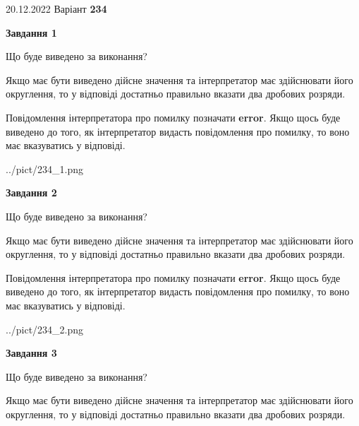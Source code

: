 \documentclass[12pt, ukrainian]{article}
\begin{document}
{20.12.2022 Варіант \No \textbf { 234 }\par}
{
\begin {Large}

{\begin {center}\textbf{Завдання 1}\end {center}}\par
Що буде виведено за виконання? \par

Якщо має бути виведено дійсне значення та інтерпретатор має здійснювати його округлення, 
то у відповіді достатньо правильно вказати два дробових розряди.

Повідомлення інтерпретатора про помилку позначати \textbf{error}.
Якщо щось буде виведено до того, як інтерпретатор видасть повідомлення про помилку, 
то воно має вказуватись у відповіді. \par

\begin{center}
	{../pict/234_1.png}
\end{center}
\newpage

{\begin {center}\textbf{Завдання 2}\end {center}}\par
Що буде виведено за виконання? \par

Якщо має бути виведено дійсне значення та інтерпретатор має здійснювати його округлення, 
то у відповіді достатньо правильно вказати два дробових розряди.

Повідомлення інтерпретатора про помилку позначати \textbf{error}.
Якщо щось буде виведено до того, як інтерпретатор видасть повідомлення про помилку, 
то воно має вказуватись у відповіді. \par

\begin{center}
	{../pict/234_2.png}
\end{center}
\newpage

{\begin {center}\textbf{Завдання 3}\end {center}}\par
Що буде виведено за виконання? \par

Якщо має бути виведено дійсне значення та інтерпретатор має здійснювати його округлення, 
то у відповіді достатньо правильно вказати два дробових розряди.


\end{Large}}
\end{document}
